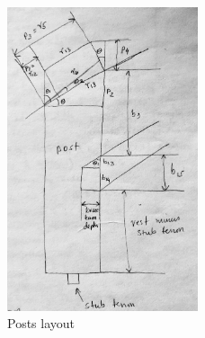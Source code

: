 \documentclass{article}\usepackage[]{graphicx}\usepackage[]{xcolor}
\begin{document}
\begin{figure}
  \begin{center}
  	\includegraphics[width=0.5\textwidth]{images/post_calculations}
  \end{center}
	\caption{Posts layout}
\end{figure}

% 
\end{document}
